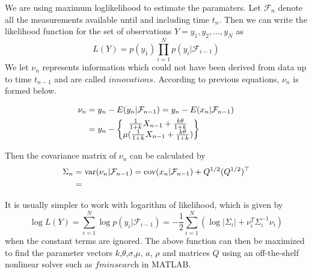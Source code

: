 \documentclass{amsart}
\numberwithin{equation}{section}
\begin{document}
We are using maximum loglikelihood to estimate the paramaters. Let $\mathcal F_{n}$ denote all the measurements available until and including time $t_{n}$. Then we can write the likelihood function for the set of observations $Y = {y_{1},y_{2},\dots, y_{N}}$ as 
$$
L(Y) = p(y_{1})\prod_{i=1}^{N}p(y_{i}|\mathcal F_{i-1})
$$
We let $\nu_{n}$ represents information which could not have been derived from data up to time $t_{n-1}$ and are called $\textit{innovations}$. According to previous equations, $\nu_{n}$ is formed below.

\begin{align}
\nu_{n}&=y_{n}-E(y_{n}|\mathcal F_{n-1})
=y_{n}-E(x_{n}|\mathcal F_{n-1})  \notag \\
&=y_{n}-\left\{
\begin{matrix}
\frac{1}{1+k}X_{n-1}+\frac{k\theta}{1+k}\\
\mu(\frac{1}{1+k}X_{n-1}+\frac{k\theta}{1+k})
\end{matrix}
\right\}
\end{align}



Then the covariance matrix of $\nu_{n}$ can be calculated by
%
%
\begin{align}
\Sigma_{n}&=\textup{var}(\nu_{n}|\mathcal F_{n-1})
=\textup{cov}(x_{n}|\mathcal F_{n-1})+Q^{1/2}(Q^{1/2})^{\top}\notag\\
&=
\end{align}



It is usually simpler to work with logarithm of likelihood, which is given by 
$$
\log L(Y) = \sum_{i=1}^{N}\log p(y_{i}|\mathcal F_{i-1})=-\frac{1}{2}\sum_{i=1}^{N}(\log|\Sigma_{i}|+\nu_{i}^{T} \Sigma_{i}^{-1}\nu_{i})
$$
when the constant terms are ignored. The above function can then be maximized to find the parameter vectors $k$,$\theta$,$\sigma$,$\mu$, $a$, $\rho$ and matrices $Q$ using an off-the-shelf nonlinear solver such as $\textit{fminsearch}$ in MATLAB. 
\end{document}

